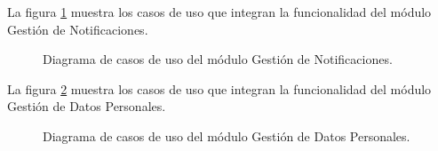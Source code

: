 La figura \ref{fig:casosUso:Noti} muestra los casos de uso que integran la funcionalidad del módulo Gestión de Notificaciones.

\begin{figure}[htpb!]
	\begin{center}
		\caption{Diagrama de casos de uso del módulo Gestión de Notificaciones. \label{fig:casosUso:Noti}}
	\end{center}
\end{figure}

La figura \ref{fig:casosUso:Perso} muestra los casos de uso que integran la funcionalidad del módulo Gestión de Datos Personales.

\begin{figure}[htpb!]
	\begin{center}
		\caption{Diagrama de casos de uso del módulo Gestión de Datos Personales. \label{fig:casosUso:Perso}}
	\end{center}
\end{figure}

